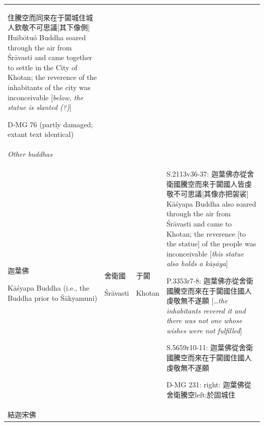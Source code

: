 \documentclass[
  english,
  a4paper,
  DIV=12,
  footlines=2.1,
  usegeometry=true]{scrartcl}
\begin{document}
\begin{longtable}[]{@{}llll@{}}
\begin{minipage}[t]{0.44\columnwidth}
住騰空而同來在于闐城住城人欽敬不可思議{[}其下像側{]} Huībōtuó Buddha
soared through the air from Śrāvasti and came together to settle in the
City of Khotan; the reverence of the inhabitants of the city was
inconceivable {[}\emph{below, the statue is slanted (?)}{]}

D-MG 76 (partly damaged; extant text identical)\strut
\end{minipage}\tabularnewline
\begin{minipage}[t]{0.18\columnwidth}\raggedright
\emph{Other buddhas}\strut
\end{minipage} & \begin{minipage}[t]{0.13\columnwidth}\raggedright
\strut
\end{minipage} & \begin{minipage}[t]{0.13\columnwidth}\raggedright
\strut
\end{minipage} & \begin{minipage}[t]{0.44\columnwidth}\raggedright
\strut
\end{minipage}\tabularnewline
\begin{minipage}[t]{0.18\columnwidth}\raggedright
迦葉佛

Kāśyapa Buddha (i.e., the Buddha prior to Śākyamuni)\strut
\end{minipage} & \begin{minipage}[t]{0.13\columnwidth}\raggedright
舍衛國

Śrāvasti\strut
\end{minipage} & \begin{minipage}[t]{0.13\columnwidth}\raggedright
于闐

Khotan\strut
\end{minipage} & \begin{minipage}[t]{0.44\columnwidth}\raggedright
S.2113v36-37:
迦葉佛亦從舍衛國騰空而來于闐國人皆虔敬不可思議{[}其像亦把袈裟{]} Kāśyapa
Buddha also soared through the air from Śrāvasti and came to Khotan; the
reverence {[}to the statue{]} of the people was inconceivable
{[}\emph{this statue also holds a kāṣāya}{]}

P.3353r7-8: 迦葉佛亦從舍衛國騰空而來在于闐國住國人虔敬無不遂願
{[}\ldots{}\emph{the inhabitants revered it and there was not one whose
wishes were not fulfilled}{]}

S.5659r10-11: 迦葉佛從舍衛國騰空而來在于闐國住國人虔敬無不遂願

D-MG 231: right: 迦葉佛從舍衛騰空left:於固城住\strut
\end{minipage}\tabularnewline
\begin{minipage}[t]{0.18\columnwidth}\raggedright
結迦宋佛


\end{minipage}
\end{longtable}
\end{document}
